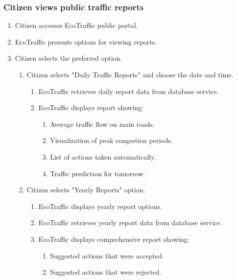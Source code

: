 \documentclass[12pt, a4paper, twoside, openright]{report}
\begin{document}
\subsubsection{Citizen views public traffic reports}\label{subsubsec:citizen-views}

\begin{enumerate}
\item
  Citizen accesses EcoTraffic public portal.
\item
  EcoTraffic presents options for viewing reports.
\item
  Citizen selects the preferred option.

  \begin{enumerate}
  \item
    Citizen selects "Daily Traffic Reports" and choose the date and
    time.
    \begin{enumerate}
    \item
      EcoTraffic retrieves daily report data from database service.
    \item
      EcoTraffic displays report showing:

  \begin{enumerate}
        \def\labelenumiv{\alph{enumiv}.}
        \item
          Average traffic flow on main roads.
        \item
          Visualization of peak congestion periods.
        \item
          List of actions taken automatically.
        \item
          Traffic prediction for tomorrow.
        \end{enumerate}
      \end{enumerate}
    \item
      Citizen selects "Yearly Reports" option.
  
      \begin{enumerate}
      \item
        EcoTraffic displays yearly report options.
      \item
        EcoTraffic retrieves yearly report data from database service.
      \item
        EcoTraffic displays comprehensive report showing:
  
        \begin{enumerate}
        \def\labelenumiv{\roman{enumiv}}
        \item
          Suggested actions that were accepted.
        \item
          Suggested actions that were rejected.
        \end{enumerate}
      \end{enumerate}
    \end{enumerate}
  \end{enumerate}
\end{document}
